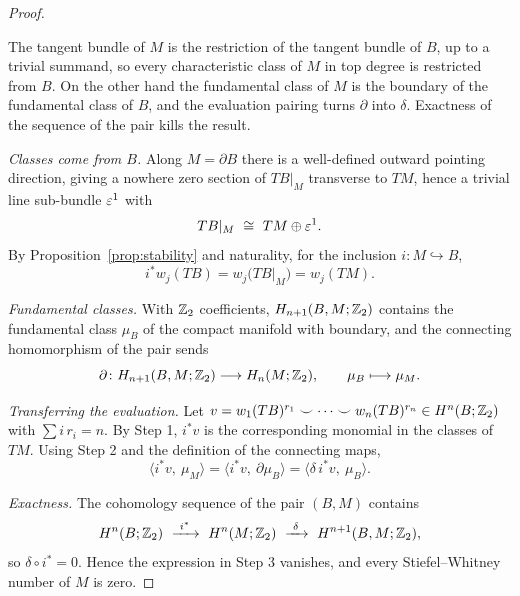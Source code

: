 \begin{proof}
\begin{strategy}
The tangent bundle of $M$ is the restriction of the tangent bundle of $B$, up to
a trivial summand, so every characteristic class of $M$ in top degree is
restricted from $B$. On the other hand the fundamental class of $M$ is the
boundary of the fundamental class of $B$, and the evaluation pairing turns
$\partial$ into $\delta$. Exactness of the sequence of the pair kills the
result.
\end{strategy}

 \emph{Classes come from $B$.} Along $M=\partial B$ there is a
well-defined outward pointing direction, giving a nowhere zero section of
$TB|_M$ transverse to $TM$, hence a trivial line sub-bundle $\varepsilon^1$ with
\[
TB|_M\ \cong\ TM\oplus\varepsilon^1 .
\]
By Proposition~\ref{prop:stability} and naturality, for the inclusion
$i\colon M\hookrightarrow B$,
\[
i^*w_j(TB)=w_j\big(TB|_M\big)=w_j(TM).
\]

 \emph{Fundamental classes.} With $\mathbb{Z}_2$ coefficients,
$H_{n+1}(B,M;\mathbb{Z}_2)$ contains the fundamental class $\mu_B$ of the compact
manifold with boundary, and the connecting homomorphism of the pair sends
\[
\partial\colon H_{n+1}(B,M;\mathbb{Z}_2)\longrightarrow H_n(M;\mathbb{Z}_2),
\qquad
\mu_B\longmapsto\mu_M .
\]

 \emph{Transferring the evaluation.} Let
$v=w_1(TB)^{r_1}\smile\cdots\smile w_n(TB)^{r_n}\in H^n(B;\mathbb{Z}_2)$ with
$\sum i\,r_i=n$. By Step 1, $i^*v$ is the corresponding monomial in the classes
of $TM$. Using Step 2 and the definition of the connecting maps,
\[
\big\langle i^*v,\ \mu_M\big\rangle
=\big\langle i^*v,\ \partial\mu_B\big\rangle
=\big\langle \delta\,i^*v,\ \mu_B\big\rangle .
\]

 \emph{Exactness.} The cohomology sequence of the pair $(B,M)$ contains
\[
H^n(B;\Z_2)\ \xrightarrow{\ i^*\ }\ H^n(M;\Z_2)
\ \xrightarrow{\ \delta\ }\ H^{n+1}(B,M;\Z_2),
\]
so $\delta\circ i^*=0$. Hence the expression in Step 3 vanishes, and every
Stiefel--Whitney number of $M$ is zero.
\end{proof}

\begin{center}
\end{center}

